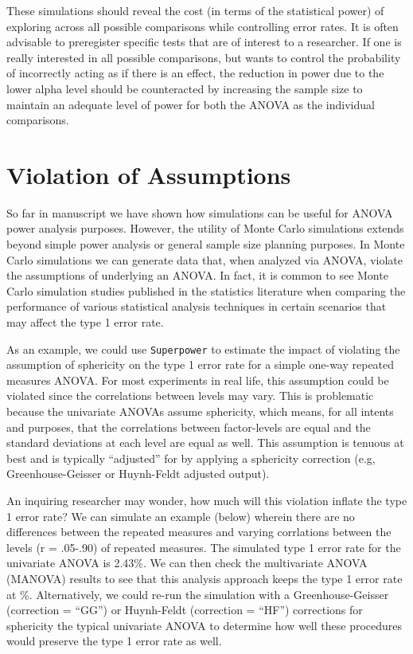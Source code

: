 \documentclass[
  ,jou,floatsintext]{apa6}
\begin{document}
These simulations should reveal the cost (in terms of the statistical power) of exploring across all possible comparisons while controlling error rates.
It is often advisable to preregister specific tests that are of interest to a researcher.
If one is really interested in all possible comparisons, but wants to control the probability of incorrectly acting as if there is an effect, the reduction in power due to the lower alpha level should be counteracted by increasing the sample size to maintain an adequate level of power for both the ANOVA as the individual comparisons.

\hypertarget{violation-of-assumptions}{%
\section{Violation of Assumptions}\label{violation-of-assumptions}}

So far in manuscript we have shown how simulations can be useful for ANOVA power analysis purposes. However, the utility of Monte Carlo simulations extends beyond simple power analysis or general sample size planning purposes. In Monte Carlo simulations we can generate data that, when analyzed via ANOVA, violate the assumptions of underlying an ANOVA. In fact, it is common to see Monte Carlo simulation studies published in the statistics literature when comparing the performance of various statistical analysis techniques in certain scenarios that may affect the type 1 error rate.

As an example, we could use \texttt{Superpower} to estimate the impact of violating the assumption of sphericity on the type 1 error rate for a simple one-way repeated measures ANOVA. For most experiments in real life, this assumption could be violated since the correlations between levels may vary. This is problematic because the univariate ANOVAs assume sphericity, which means, for all intents and purposes, that the correlations between factor-levels are equal and the standard deviations at each level are equal as well. This assumption is tenuous at best and is typically \enquote{adjusted} for by applying a sphericity correction (e.g, Greenhouse-Geisser or Huynh-Feldt adjusted output).

An inquiring researcher may wonder, how much will this violation inflate the type 1 error rate? We can simulate an example (below) wherein there are no differences between the repeated measures and varying corrlations between the levels (r = .05-.90) of repeated measures. The simulated type 1 error rate for the univariate ANOVA is 2.43\%. We can then check the multivariate ANOVA (MANOVA) results to see that this analysis approach keeps the type 1 error rate at \%. Alternatively, we could re-run the simulation with a Greenhouse-Geisser (correction = \enquote{GG}) or Huynh-Feldt (correction = \enquote{HF}) corrections for sphericity the typical univariate ANOVA to determine how well these procedures would preserve the type 1 error rate as well.
\end{document}
